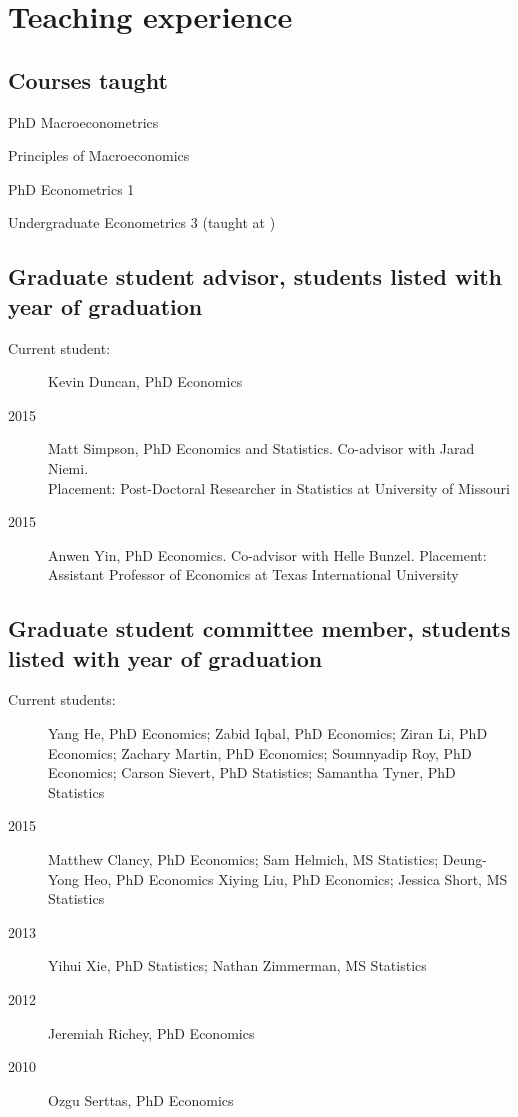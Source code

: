 \documentclass[12pt]{article}%
\newcommand{\allcaps}[1]{\textls{\MakeUppercase{#1}}}
\newcommand{\p}{\rlap{.}}
\begin{document}
\section*{Teaching experience}

\subsection*{Courses taught}
\begin{description}[noitemsep]
\item[2011--present] PhD Macroeconometrics
\item[2010--present] Principles of Macroeconomics
\item[2009--present] PhD Econometrics 1
\item[2009\p] Undergraduate Econometrics 3 (taught at \allcaps{UCSD})
\end{description}

\subsection*{Graduate student advisor, students listed with year of graduation}
\begin{description}
\item[Current student:] Kevin Duncan, PhD Economics
\item[2015] Matt Simpson, PhD Economics and Statistics.  Co-advisor
with Jarad Niemi.\\
Placement: Post-Doctoral Researcher in Statistics at University of Missouri
\item[2015] Anwen Yin, PhD Economics. Co-advisor with Helle Bunzel.
Placement: Assistant Professor of Economics at Texas 
International University
\end{description}

\subsection*{Graduate student committee member, students listed with year of graduation}

\begin{description}
\item[Current students:]
Yang He, PhD Economics;
Zabid Iqbal, PhD Economics;
Ziran Li, PhD Economics;
Zachary Martin, PhD Economics;
Soumnyadip Roy, PhD Economics;
Carson Sievert, PhD Statistics;
Samantha Tyner, PhD Statistics
\item[2015]
Matthew Clancy, PhD Economics;
Sam Helmich, MS Statistics;
Deung-Yong Heo, PhD Economics
Xiying Liu, PhD Economics;
Jessica Short, MS Statistics
\item[2013]
Yihui Xie, PhD Statistics;
Nathan Zimmerman, MS Statistics
\item[2012] Jeremiah Richey, PhD Economics
\item[2010] Ozgu Serttas, PhD Economics
\end{description}
\end{document}

